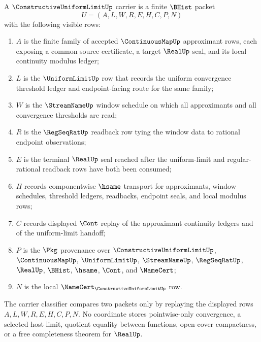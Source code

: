 \begin{definition}
\label{def:constructive-uniform-limit-carrier}
A $\ConstructiveUniformLimitUp$ carrier is a finite $\BHist$ packet
$$
U=(A,L,W,R,E,H,C,P,N)
$$
with the following visible rows:
\begin{enumerate}
\item $A$ is the finite family of accepted $\ContinuousMapUp$ approximant rows, each exposing a common source certificate, a target $\RealUp$ seal, and its local continuity modulus ledger;
\item $L$ is the $\UniformLimitUp$ row that records the uniform convergence threshold ledger and endpoint-facing route for the same family;
\item $W$ is the $\StreamNameUp$ window schedule on which all approximants and all convergence thresholds are read;
\item $R$ is the $\RegSeqRatUp$ readback row tying the window data to rational endpoint observations;
\item $E$ is the terminal $\RealUp$ seal reached after the uniform-limit and regular-rational readback rows have both been consumed;
\item $H$ records componentwise $\hsame$ transport for approximants, window schedules, threshold ledgers, readbacks, endpoint seals, and local modulus rows;
\item $C$ records displayed $\Cont$ replay of the approximant continuity ledgers and of the uniform-limit handoff;
\item $P$ is the $\Pkg$ provenance over $\ConstructiveUniformLimitUp$, $\ContinuousMapUp$, $\UniformLimitUp$, $\StreamNameUp$, $\RegSeqRatUp$, $\RealUp$, $\BHist$, $\hsame$, $\Cont$, and $\NameCert$;
\item $N$ is the local $\NameCert_{\ConstructiveUniformLimitUp}$ row.
\end{enumerate}
The carrier classifier compares two packets only by replaying the displayed rows $A,L,W,R,E,H,C,P,N$. No coordinate stores pointwise-only convergence, a selected host limit, quotient equality between functions, open-cover compactness, or a free completeness theorem for $\RealUp$.
\end{definition}

